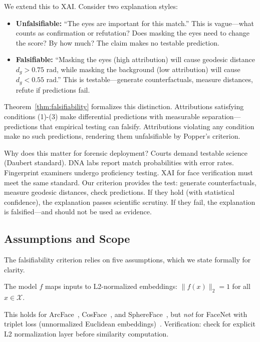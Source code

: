 We extend this to XAI. Consider two explanation styles:

\begin{itemize}
\item \textbf{Unfalsifiable:} ``The eyes are important for this match.'' This is vague—what counts as confirmation or refutation? Does masking the eyes need to change the score? By how much? The claim makes no testable prediction.

\item \textbf{Falsifiable:} ``Masking the eyes (high attribution) will cause geodesic distance $d_g > 0.75$ rad, while masking the background (low attribution) will cause $d_g < 0.55$ rad.'' This is testable—generate counterfactuals, measure distances, refute if predictions fail.
\end{itemize}

Theorem~\ref{thm:falsifiability} formalizes this distinction. Attributions satisfying conditions (1)-(3) make differential predictions with measurable separation—predictions that empirical testing can falsify. Attributions violating any condition make no such predictions, rendering them unfalsifiable by Popper's criterion.

Why does this matter for forensic deployment? Courts demand testable science (Daubert standard). DNA labs report match probabilities with error rates. Fingerprint examiners undergo proficiency testing. XAI for face verification must meet the same standard. Our criterion provides the test: generate counterfactuals, measure geodesic distances, check predictions. If they hold (with statistical confidence), the explanation passes scientific scrutiny. If they fail, the explanation is falsified—and should not be used as evidence.

\subsection{Assumptions and Scope}

The falsifiability criterion relies on five assumptions, which we state formally for clarity.

\begin{assumption}
\label{assump:hypersphere}
The model $f$ maps inputs to L2-normalized embeddings: $\|f(x)\|_2 = 1$ for all $x \in \mathcal{X}$.
\end{assumption}

This holds for ArcFace~\citep{deng2019arcface}, CosFace~\citep{wang2018cosface}, and SphereFace~\citep{liu2017sphereface}, but \emph{not} for FaceNet with triplet loss (unnormalized Euclidean embeddings)~\citep{schroff2015facenet}. Verification: check for explicit L2 normalization layer before similarity computation.

